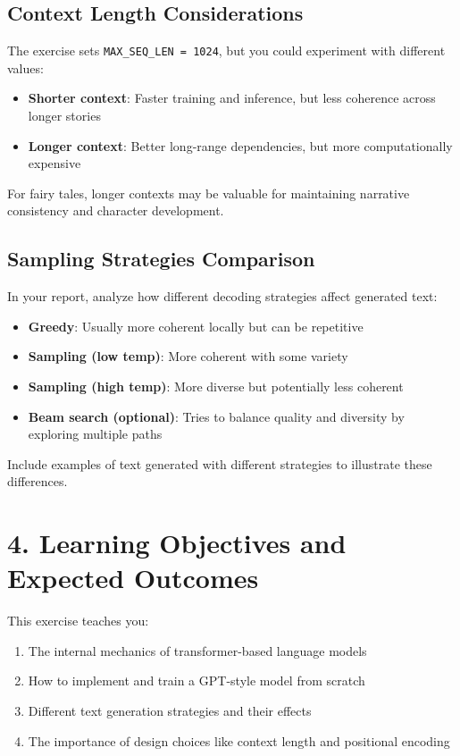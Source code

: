 \subsection*{Context Length Considerations}

The exercise sets \texttt{MAX\_SEQ\_LEN = 1024}, but you could experiment with different values:

\begin{itemize}
    \item \textbf{Shorter context}: Faster training and inference, but less coherence across longer stories
    \item \textbf{Longer context}: Better long-range dependencies, but more computationally expensive
\end{itemize}

For fairy tales, longer contexts may be valuable for maintaining narrative consistency and character development.

\subsection*{Sampling Strategies Comparison}

In your report, analyze how different decoding strategies affect generated text:

\begin{itemize}
    \item \textbf{Greedy}: Usually more coherent locally but can be repetitive
    \item \textbf{Sampling (low temp)}: More coherent with some variety
    \item \textbf{Sampling (high temp)}: More diverse but potentially less coherent
    \item \textbf{Beam search (optional)}: Tries to balance quality and diversity by exploring multiple paths
\end{itemize}

Include examples of text generated with different strategies to illustrate these differences.
\section*{4. Learning Objectives and Expected Outcomes}

This exercise teaches you:

\begin{enumerate}
    \item The internal mechanics of transformer-based language models
    \item How to implement and train a GPT-style model from scratch
    \item Different text generation strategies and their effects
    \item The importance of design choices like context length and positional encoding
\end{enumerate}

